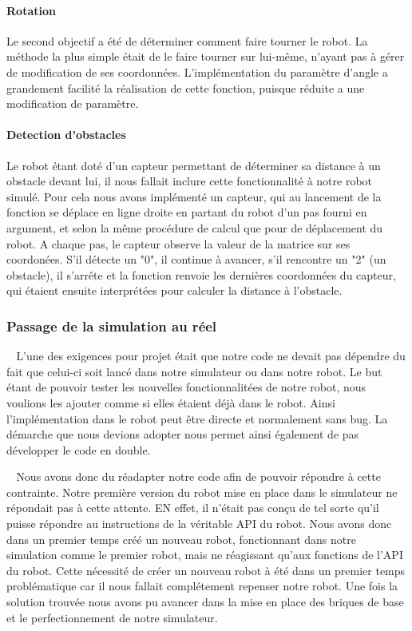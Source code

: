 \documentclass[12pt]{article}
\def\tab{$\>\>\>\>$}
\begin{document}
\paragraph{Rotation\\}
Le second objectif a été de déterminer comment faire tourner le robot. La méthode la plus simple était de le faire tourner sur lui-même, n'ayant pas à gérer de modification de ses coordonnées. L'implémentation du paramètre d'angle a grandement facilité la réalisation de cette fonction, puisque réduite a une modification de paramètre.

\paragraph{Detection d'obstacles\\}
Le robot étant doté d'un capteur permettant de déterminer sa distance à un obstacle devant lui, il nous fallait inclure cette fonctionnalité à notre robot simulé. Pour cela nous avons implémenté un capteur, qui au lancement de la fonction se déplace en ligne droite en partant du robot d'un pas fourni en argument, et selon la même procédure de calcul que pour de déplacement du robot. A chaque pas, le capteur observe la valeur de la matrice sur ses coordonées. S'il détecte un "0", il continue à avancer, s'il rencontre un "2" (un obstacle), il s'arrête et la fonction renvoie les dernières coordonnées du capteur, qui étaient ensuite interprétées pour calculer la distance à l'obstacle.

\subsubsection{Passage de la simulation au réel}
\tab L'une des exigences pour projet était que notre code ne devait pas dépendre du fait que celui-ci soit lancé dans notre simulateur ou dans notre robot. Le but étant de pouvoir tester les nouvelles fonctionnalitées de notre robot, nous voulions les ajouter comme si elles étaient déjà dans le robot. Ainsi l'implémentation dans le robot peut être directe et normalement sans bug. La démarche que nous devions adopter nous permet ainsi également de pas développer le code en double.

\tab Nous avons donc du réadapter notre code afin de pouvoir répondre à cette contrainte. Notre première version du robot mise en place dans le simulateur ne répondait pas à cette attente. EN effet, il n'était pas conçu de tel sorte qu'il puisse répondre au instructions de la véritable API du robot. Nous avons donc dans un premier temps créé un nouveau robot, fonctionnant dans notre simulation comme le premier robot, mais ne réagissant qu'aux fonctions de l'API du robot. Cette nécessité de créer un nouveau robot à été dans un premier temps problématique car il nous fallait complétement repenser notre robot. Une fois la solution trouvée nous avons pu avancer dans la mise en place des briques de base et le perfectionnement de notre simulateur.
\end{document}
